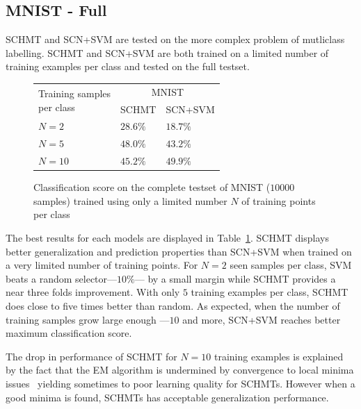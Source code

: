 \documentclass{article}
\begin{document}
  \vspace{-5pt}
  \subsection{MNIST - Full}
    \label{subsec:Exps/MNIST - Full}
    \vspace{-5pt}
		SCHMT and SCN+SVM are tested on the more complex problem of mutliclass labelling. SCHMT and SCN+SVM are both trained on a limited number of training examples per class and tested on the full testset.

		\begin{figure}
      \hspace{40pt}
      \begin{tabular}{  |p{2.5cm}
                        |p{1.5cm}
                        |p{1.5cm}|}
        \hline
        \multirow{2}{*}{\parbox[t]{2.5cm}{Training samples \\ per class}} & \multicolumn{2}{c|}{MNIST}\\
        \cline{2-3}
                & SCHMT & SCN+SVM \\
        \hline
        $N = 2$     & $\mathbf{28.6}\%$  & $18.7\%$   \\
        \hline
        $N = 5$     & $\mathbf{48.0\%}$ & $43.2\%$  \\
        \hline
        $N = 10$    & $45.2\%$  & $\mathbf{49.9\%}$  \\       
        \hline
      \end{tabular}
      \caption{Classification score on the complete testset of MNIST ($10000$ samples) trained using only a limited number $N$ of training points per class}
      \label{tab:Exp2 results}
      \vspace{-15pt}
    \end{figure}
		
    The best results for each models are displayed in Table~\ref{tab:Exp2 results}. SCHMT displays better generalization and prediction properties than SCN+SVM when trained on a very limited number of training points. For $N=2$ seen samples per class, SVM beats a random selector---\ie $10\%$--- by a small margin while SCHMT provides a near three folds improvement. With only $5$ training examples per class, SCHMT does close to five times better than random. As expected, when the number of training samples grow large enough ---\ie $10$ and more, SCN+SVM reaches better maximum classification score.
		
		The drop in performance of SCHMT for $N=10$ training examples is explained by the fact that the EM algorithm is undermined by convergence to local minima issues~\cite{moon1996expectation} yielding sometimes to poor learning quality for SCHMTs. However when a good minima is found, SCHMTs has acceptable generalization performance. 
    
\end{document}

